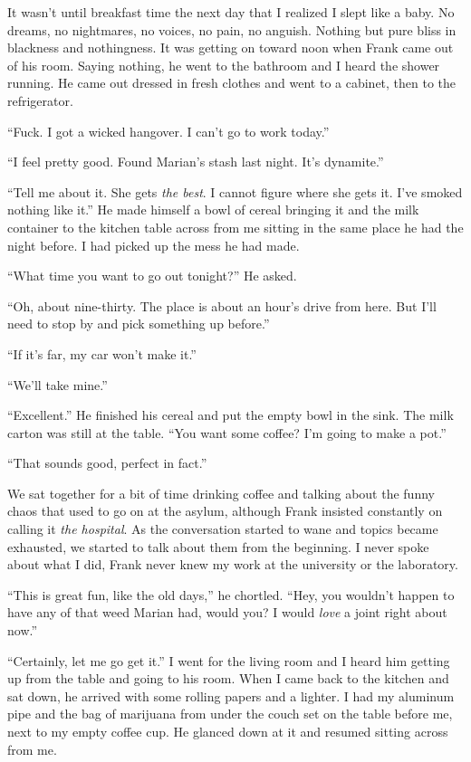 \documentclass[
]{article}
\begin{document}
It wasn't until breakfast time the next day that I realized I slept like
a baby. No dreams, no nightmares, no voices, no pain, no anguish.
Nothing but pure bliss in blackness and nothingness. It was getting on
toward noon when Frank came out of his room. Saying nothing, he went to
the bathroom and I heard the shower running. He came out dressed in
fresh clothes and went to a cabinet, then to the refrigerator.

``Fuck. I got a wicked hangover. I can't go to work today.''

``I feel pretty good. Found Marian's stash last night. It's dynamite.''

``Tell me about it. She gets \emph{the best}. I cannot figure where she
gets it. I've smoked nothing like it.'' He made himself a bowl of cereal
bringing it and the milk container to the kitchen table across from me
sitting in the same place he had the night before. I had picked up the
mess he had made.

``What time you want to go out tonight?'' He asked.

``Oh, about nine-thirty. The place is about an hour's drive from here.
But I'll need to stop by and pick something up before.''

``If it's far, my car won't make it.''

``We'll take mine.''

``Excellent.'' He finished his cereal and put the empty bowl in the
sink. The milk carton was still at the table. ``You want some coffee?
I'm going to make a pot.''

``That sounds good, perfect in fact.''

We sat together for a bit of time drinking coffee and talking about the
funny chaos that used to go on at the asylum, although Frank insisted
constantly on calling it \emph{the hospital}. As the conversation
started to wane and topics became exhausted, we started to talk about
them from the beginning. I never spoke about what I did, Frank never
knew my work at the university or the laboratory.

``This is great fun, like the old days,'' he chortled. ``Hey, you
wouldn't happen to have any of that weed Marian had, would you? I would
\emph{love} a joint right about now.''

``Certainly, let me go get it.'' I went for the living room and I heard
him getting up from the table and going to his room. When I came back to
the kitchen and sat down, he arrived with some rolling papers and a
lighter. I had my aluminum pipe and the bag of marijuana from under the
couch set on the table before me, next to my empty coffee cup. He
glanced down at it and resumed sitting across from me.
\end{document}
